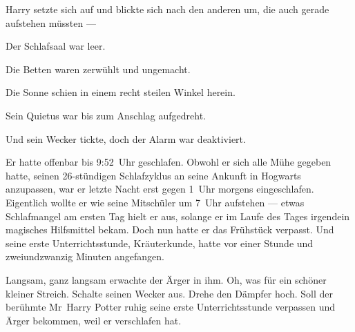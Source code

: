 Harry setzte sich auf und blickte sich nach den anderen um, die auch gerade aufstehen müssten —





Der Schlafsaal war leer.

Die Betten waren zerwühlt und ungemacht.

Die Sonne schien in einem recht steilen Winkel herein.

Sein Quietus war bis zum Anschlag aufgedreht.

Und sein Wecker tickte, doch der Alarm war deaktiviert.

Er hatte offenbar bis 9:52~Uhr geschlafen. Obwohl er sich alle Mühe gegeben hatte, seinen 26-stündigen Schlafzyklus an seine Ankunft in Hogwarts anzupassen, war er letzte Nacht erst gegen 1~Uhr morgens eingeschlafen. Eigentlich wollte er wie seine Mitschüler um 7~Uhr aufstehen — etwas Schlafmangel am ersten Tag hielt er aus, solange er im Laufe des Tages irgendein magisches Hilfsmittel bekam. Doch nun hatte er das Frühstück verpasst. Und seine erste Unterrichtsstunde, Kräuterkunde, hatte vor einer Stunde und zweiundzwanzig Minuten angefangen.

Langsam, ganz langsam erwachte der Ärger in ihm. Oh, was für ein schöner kleiner Streich. Schalte seinen Wecker aus. Drehe den Dämpfer hoch. Soll der berühmte Mr~Harry Potter ruhig seine erste Unterrichtsstunde verpassen und Ärger bekommen, weil er verschlafen hat.

